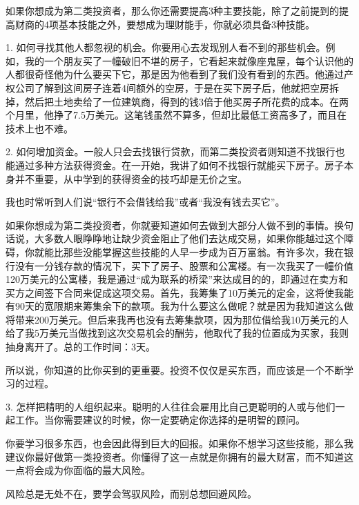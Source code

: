 如果你想成为第二类投资者，那么你还需要提高3种主要技能，除了之前提到的提高财商的4项基本技能之外，要想成为理财能手，你就必须具备3种技能。

1. 如何寻找其他人都忽视的机会。你要用心去发现别人看不到的那些机会。例如，我的一个朋友买了一幢破旧不堪的房子，它看起来就像座鬼屋，每个认识他的人都很奇怪他为什么要买下它，那是因为他看到了我们没有看到的东西。他通过产权公司了解到这间房子连着4间额外的空房，于是在买下房子后，他就把空房拆掉，然后把土地卖给了一位建筑商，得到的钱3倍于他买房子所花费的成本。在两个月里，他挣了7.5万美元。这笔钱虽然不算多，但却比最低工资高多了，而且在技术上也不难。

2. 如何增加资金。一般人只会去找银行贷款，而第二类投资者则知道不找银行也能通过多种方法获得资金。在一开始，我讲了如何不找银行就能买下房子。房子本身并不重要，从中学到的获得资金的技巧却是无价之宝。

我也时常听到人们说“银行不会借钱给我”或者“我没有钱去买它”。

如果你想成为第二类投资者，你就要知道如何去做到大部分人做不到的事情。换句话说，大多数人眼睁睁地让缺少资金阻止了他们去达成交易，如果你能越过这个障碍，你就能比那些没能掌握这些技能的人早一步成为百万富翁。有许多次，我在银行没有一分钱存款的情况下，买下了房子、股票和公寓楼。有一次我买了一幢价值120万美元的公寓楼，我是通过“成为联系的桥梁”来达成目的的，即通过在卖方和买方之间签下合同来促成这项交易。首先，我筹集了10万美元的定金，这将使我能有90天的宽限期来筹集余下的款项。我为什么要这么做呢？就是因为我知道这么做将带来200万美元。但后来我再也没有去筹集款项，因为那位借给我10万美元的人给了我5万美元当做找到这次交易机会的酬劳，他取代了我的位置成为买家，我则抽身离开了。总的工作时间：3天。

所以说，你知道的比你买到的更重要。投资不仅仅是买东西，而应该是一个不断学习的过程。

3. 怎样把精明的人组织起来。聪明的人往往会雇用比自己更聪明的人或与他们一起工作。当你需要建议的时候，你一定要确定你选择的是明智的顾问。

你要学习很多东西，也会因此得到巨大的回报。如果你不想学习这些技能，那么我建议你最好做第一类投资者。你懂得了这一点就是你拥有的最大财富，而不知道这一点将会成为你面临的最大风险。

风险总是无处不在，要学会驾驭风险，而别总想回避风险。
